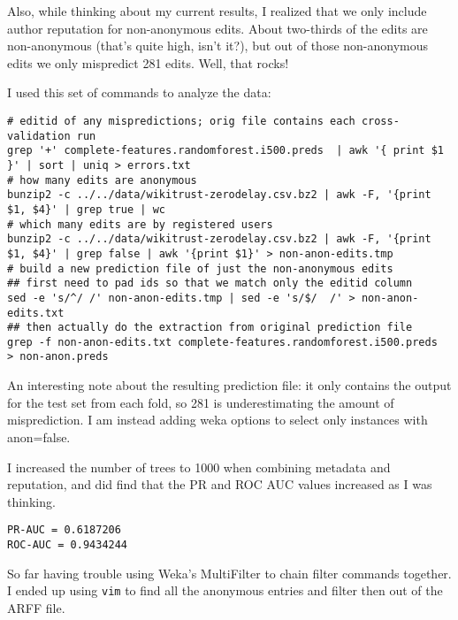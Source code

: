 Also, while thinking about my current results, I realized that we only
include author reputation for non-anonymous edits.
About two-thirds of the edits are non-anonymous (that's quite high,
isn't it?), but out of those non-anonymous edits we only mispredict 281 edits.
Well, that rocks!

I used this set of commands to analyze the data:
\begin{verbatim}
# editid of any mispredictions; orig file contains each cross-validation run
grep '+' complete-features.randomforest.i500.preds  | awk '{ print $1 }' | sort | uniq > errors.txt
# how many edits are anonymous
bunzip2 -c ../../data/wikitrust-zerodelay.csv.bz2 | awk -F, '{print $1, $4}' | grep true | wc
# which many edits are by registered users
bunzip2 -c ../../data/wikitrust-zerodelay.csv.bz2 | awk -F, '{print $1, $4}' | grep false | awk '{print $1}' > non-anon-edits.tmp
# build a new prediction file of just the non-anonymous edits
## first need to pad ids so that we match only the editid column
sed -e 's/^/ /' non-anon-edits.tmp | sed -e 's/$/  /' > non-anon-edits.txt
## then actually do the extraction from original prediction file
grep -f non-anon-edits.txt complete-features.randomforest.i500.preds  > non-anon.preds
\end{verbatim}

An interesting note about the resulting prediction file: it only
contains the output for the test set from each fold, so 281 is
underestimating the amount of misprediction.
I am instead adding weka options to select only instances with
anon=false.

I increased the number of trees to 1000 when combining metadata and
reputation, and did find that the PR and ROC AUC values increased
as I was thinking.
\begin{verbatim}
PR-AUC = 0.6187206
ROC-AUC = 0.9434244
\end{verbatim}

So far having trouble using Weka's MultiFilter to chain filter commands
together.  I ended up using \texttt{vim} to find all the anonymous
entries and filter then out of the ARFF file.


